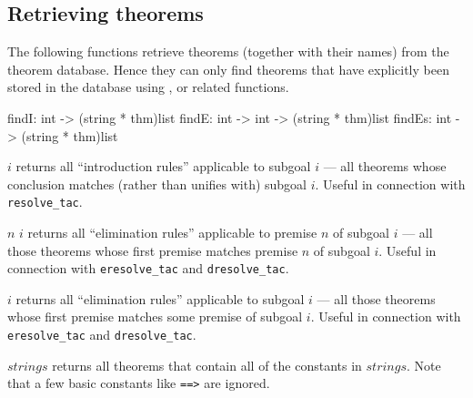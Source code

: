 \subsection{Retrieving theorems}

The following functions retrieve theorems (together with their names) from
the theorem database.  Hence they can only find theorems that have explicitly
been stored in the database using ,  or
related functions.
\begin{ttbox} 
findI:         int -> (string * thm)list
findE:  int -> int -> (string * thm)list
findEs:        int -> (string * thm)list
\end{ttbox}
\begin{ttdescription}
\item[\ttindexbold{findI} $i$]
  returns all ``introduction rules'' applicable to subgoal $i$ --- all
  theorems whose conclusion matches (rather than unifies with) subgoal
  $i$.  Useful in connection with {\tt resolve_tac}.

\item[\ttindexbold{findE} $n$ $i$] returns all ``elimination rules''
  applicable to premise $n$ of subgoal $i$ --- all those theorems whose
  first premise matches premise $n$ of subgoal $i$.  Useful in connection with
  {\tt eresolve_tac} and {\tt dresolve_tac}.

\item[\ttindexbold{findEs} $i$] returns all ``elimination rules'' applicable
  to subgoal $i$ --- all those theorems whose first premise matches some
  premise of subgoal $i$.  Useful in connection with {\tt eresolve_tac} and
  {\tt dresolve_tac}.

\item[\ttindexbold{thms_containing} $strings$] returns all theorems that
  contain all of the constants in $strings$.  Note that a few basic constants
  like \verb$==>$ are ignored.
\end{ttdescription}


